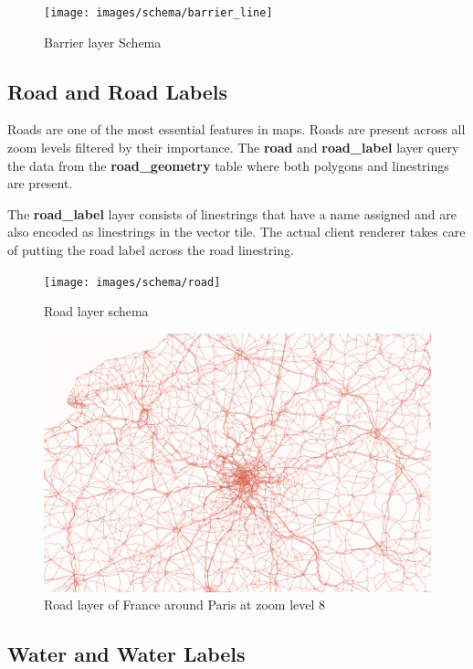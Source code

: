 \begin{figure}[H]
  \centering
  \texttt{[image: images/schema/barrier\_line]}
  \caption{Barrier layer Schema}
\end{figure}

\subsection{Road and Road Labels}

Roads are one of the most essential features in maps. Roads are present across all zoom levels filtered by their importance. The \textbf{road} and \textbf{road\_label} layer query the data from the \textbf{road\_geometry} table where both polygons and linestrings are present.

The \textbf{road\_label} layer consists of linestrings that have a name assigned and are also encoded as linestrings in the vector tile. The actual client renderer takes care of putting the road label across the road linestring.

\begin{figure}[H]
  \centering
  \texttt{[image: images/schema/road]}
  \caption{Road layer schema}
\end{figure}

\begin{figure}[H]
  \centering
  \includegraphics[width=1\textwidth]{images/schema/road_example}
  \caption{Road layer of France around Paris at zoom level 8}
\end{figure}

\subsection{Water and Water Labels}



